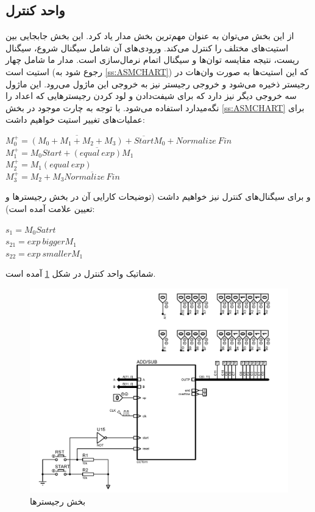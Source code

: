 \documentclass{article}
\begin{document}
\subsection{واحد کنترل}
از این بخش می‌توان به عنوان مهم‌ترین بخش مدار یاد کرد. این بخش جابجایی بین استیت‌های مختلف را کنترل می‌کند. ورودی‌های آن شامل سیگنال شروع، سیگنال ریست، نتیجه مقایسه توان‌ها و سیگنال اتمام نرمال‌سازی است. مدار ما شامل چهار استیت است (رجوع شود به \ref{ss:ASMCHART}) که این استیت‌ها به صورت وان‌هات در رجیستر ذخیره می‌شود و خروجی رجیستر نیز به خروجی این ماژول می‌رود. این ماژول سه خروجی دیگر نیز دارد که برای شیفت‌دادن و لود کردن رجیسترهایی که اعداد را نگه‌میدارد استفاده می‌شود. 
با توجه به چارت موجود در بخش \ref{ss:ASMCHART} برای عملیات‌های تغییر استیت خواهیم داشت:

\begin{latin}
\noindent
$M_0^+ = \overline{(M_0+M_1+M_2+M_3)} + \overline{Start}M_0 + Normalize~Fin$\\
$M_1^+ = M_0 Start + \overline{(equal~exp)} M_1$\\
$M_2^+ = M_1(equal~exp)$\\
$M_3^+ = M_2 + M_3\overline{Normalize~Fin}$
\end{latin}

و برای سیگنال‌های کنترل نیز خواهیم داشت (توضیحات کارایی آن در بخش رجیسترها و تعیین علامت آمده است):
\begin{latin}
\noindent
$s_1 = M_0 Satrt$\\
$s_{21} = exp~bigger M_1$\\
$s_{22} = exp~smaller M_1$
\end{latin}

شماتیک واحد کنترل در شکل  \ref{control} آمده است.

\begin{figure}
	\centering
	\includegraphics[scale=0.5, page=4]{./graphics/graphics}
	\caption{بخش رجیستر‌ها}
	\label{control}
\end{figure}
\end{document}
